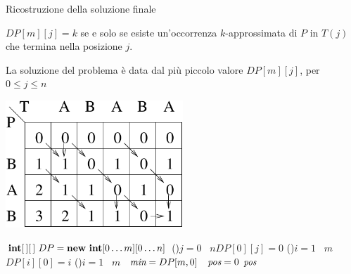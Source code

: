 \begin{frame}{Ricostruzione della soluzione finale}

\vspace{-9pt}
\BIL
\item $DP[m][j] = k$ se e solo se esiste un'occorrenza $k$-approssimata di $P$ in $T(j)$ che
termina nella posizione $j$.
\item La soluzione del problema è data dal più piccolo valore $DP[m][j]$, per $0 \leq j \leq n$
\EIL

\begin{center}
\includegraphics[width=0.5\textwidth]{stringmatching2.pdf}
\end{center}

\end{frame}

\begin{frame}[shrink=3]{}

\vspace{-9pt}
\begin{Procedure}
\caption[A]{\INTEGER\ \stringmatching($\Item[\,]\ P,\ \Item[\,]\ T,\ \INTEGER\ m,\ \INTEGER\ n$)}

$\INTARRAY[\,]\ DP = \NEW\ \INTEGER[0 \mldots m][ 0 \mldots n]$\;
\lFor(){$j = 0$ \TO\ $n$}{$DP[0][j] = 0$}
\lFor(){$i = 1$ \TO\ $m$}{$DP[i][0] = i$}
\For(){$i = 1$ \TO\ $m$}{
}
\INTEGER\ $\textit{min} = DP[m,0]$
\INTEGER\ $\textit{pos} = 0$\;
\Return $\textit{pos}$\;
\end{Procedure}

\end{frame}

